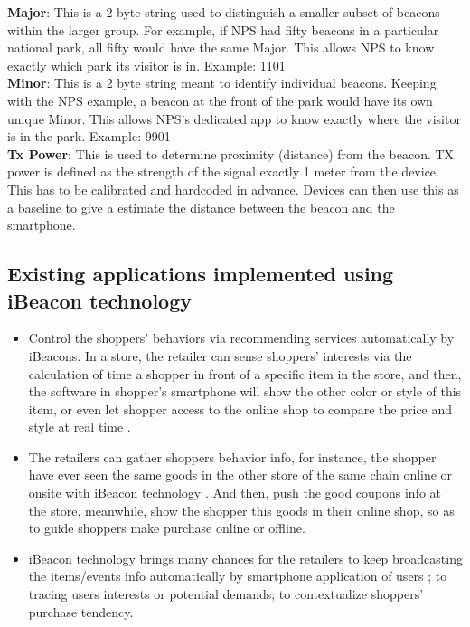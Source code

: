 \documentclass[12pt]{article}
\begin{document}
\textbf{Major}: This is a 2 byte string used to distinguish a smaller subset of beacons within the larger group. For example, if NPS had fifty beacons in a particular national park, all fifty would have the same Major. This allows NPS to know exactly which park its visitor is in. Example: 1101  \\

\textbf{Minor}: This is a 2 byte string meant to identify individual beacons. Keeping with the NPS example, a beacon at the front of the park would have its own unique Minor. This allows NPS’s dedicated app to know exactly where the visitor is in the park. Example: 9901\\

\textbf{Tx Power}: This is used to determine proximity (distance) from the beacon. TX power is defined as the strength of the signal exactly 1 meter from the device. This has to be calibrated and hardcoded in advance. Devices can then use this as a baseline to give a estimate the distance between the beacon and the smartphone.  \\

\subsection{Existing applications implemented using iBeacon technology}

\begin{itemize}
	\item Control the shoppers’ behaviors via recommending services automatically by iBeacons. In a store, the retailer can sense shoppers’ interests via the calculation of time a shopper in front of a specific item in the store, and then, the software in shopper’s smartphone will show the other color or style of this item, or even let shopper access to the online shop to compare the price and style at real time \cite{beacons}.

\item The retailers can gather shoppers behavior info, for instance, the shopper have ever seen the same goods in the other store of the same chain online or onsite with iBeacon technology \cite{beacons}. And then, push the good coupons info at the store, meanwhile, show the shopper this goods in their online shop, so as to guide shoppers make purchase online or offline.

\item iBeacon technology brings many chances for the retailers to keep broadcasting the items/events info automatically by smartphone application of users \cite{beacons}; to tracing users interests or potential demands; to contextualize shoppers’ purchase tendency.

\end{itemize}
\end{document}
